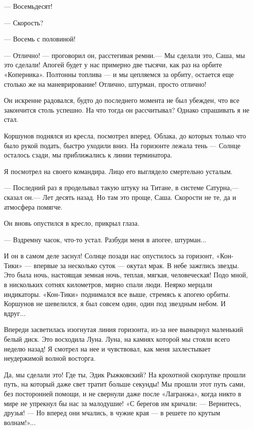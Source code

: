 \documentclass[11pt,a4paper,oneside]{article}
\begin{document}
— Восемьдесят!

— Скорость?

— Восемь с половиной!

— Отлично! — проговорил он, расстегивая ремни.— Мы сделали это, Саша, мы это сделали! Апогей будет у нас примерно две тысячи, как раз на орбите «Коперника». Полтонны топлива — и мы цепляемся за орбиту, остается еще столько же на маневрирование! Отлично, штурман, просто отлично!

Он искренне радовался, будто до последнего момента не был убежден, что все закончится столь успешно. На что тогда он рассчитывал? Однако спрашивать я не стал.

Коршунов поднялся из кресла, посмотрел вперед. Облака, до которых только что было рукой подать, быстро уходили вниз. На горизонте лежала тень — Солнце осталось сзади, мы приближались к линии терминатора.

Я посмотрел на своего командира. Лицо его выглядело смертельно усталым.

— Последний раз я проделывал такую штуку на Титане, в системе Сатурна,— сказал он.— Лет десять назад. Но там это проще, Саша. Скорости не те, да и атмосфера помягче.

Он вновь опустился в кресло, прикрыл глаза.

— Вздремну часок, что-то устал. Разбуди меня в апогее, штурман...

И он в самом деле заснул! Солнце позади нас опустилось за горизонт, «Кон-Тики» — впервые за несколько суток — окутал мрак. В небе зажглись звезды. Это была ночь, настоящая земная ночь, теплая, мягкая, человеческая! Подо мной, в нискольких сотнях километров, мирно спали люди. Неярко мерцали индикаторы. «Кон-Тики» поднимался все выше, стремясь к апогею орбиты. Коршунов не шевелился, я был совсем один, один под звездным небом. И вдруг...

Впереди засветилась изогнутая линия горизонта, из-за нее вынырнул маленький белый диск. Это восходила Луна. Луна, на камнях которой мы стояли всего неделю назад! Я смотрел на нее и чувствовал, как меня захлестывает неудержимой волной восторга.

Да, мы сделали это! Где ты, Эдик Рыжковский? На крохотной скорлупке прошли путь, на который даже свет тратит больше секунды! Мы прошли этот путь сами, без посторонней помощи, и не свернули даже после «Лагранжа», когда никто в мире не упрекнул бы нас за малодушие! «С берегов им кричали: — Вернитесь, друзья! — Но вперед они мчались, в чужие края — в решете по крутым волнам!»...
\end{document}
